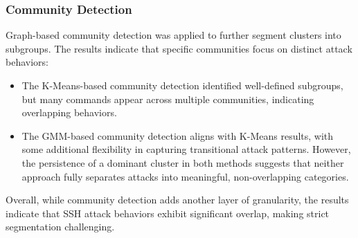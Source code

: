            \subsubsection{Community Detection \\}
            
                Graph-based community detection was applied to further segment clusters into subgroups. The results indicate that specific communities focus on distinct attack behaviors:

                \begin{itemize}
                    \item The K-Means-based community detection identified well-defined subgroups, but many commands appear across multiple communities, indicating overlapping behaviors.
                    \item The GMM-based community detection aligns with K-Means results, with some additional flexibility in capturing transitional attack patterns. However, the persistence of a dominant cluster in both methods suggests that neither approach fully separates attacks into meaningful, non-overlapping categories.
                \end{itemize}
                
                Overall, while community detection adds another layer of granularity, the results indicate that SSH attack behaviors exhibit significant overlap, making strict segmentation challenging.
                
